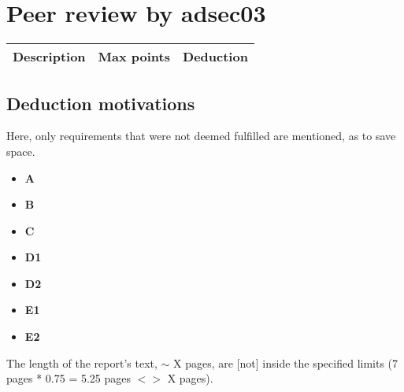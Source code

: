 \documentclass{article}
\begin{document}
	\section{Peer review by adsec03}
	 \begin{tabular}{| l | c | c |}
        \hline
        \textbf{Description} & \textbf{Max points} & \textbf{Deduction} \\
        \hline
        \hline
        
    \end{tabular}
    
    
    \subsection{Deduction motivations}
      Here, only requirements that were not deemed fulfilled are mentioned, as to save space.
      
    	\begin{itemize}
    		\item{\textbf{A} }
    		\item{\textbf{B} }
    		\item{\textbf{C} }
    		\item{\textbf{D1} }
    		\item{\textbf{D2} }
    		\item{\textbf{E1} }
    		\item{\textbf{E2} }
    	\end{itemize}
	
	The length of the report's text, $\sim$ X pages, are [not] inside the specified limits (7 pages * 0.75 = 5.25 pages $<>$  X pages).
\end{document}
